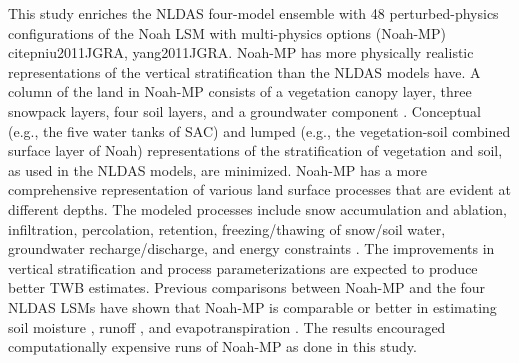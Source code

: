 \documentclass[essd]{copernicus}
\begin{document}
This study enriches the NLDAS four-model ensemble with 48 perturbed-physics configurations of the Noah LSM with multi-physics options (Noah-MP) citep{niu2011JGRA, yang2011JGRA}. Noah-MP has more physically realistic representations of the vertical stratification than the NLDAS models have. A column of the land in Noah-MP consists of a vegetation canopy layer, three snowpack layers, four soil layers, and a groundwater component \citep{niu2011JGRA}. Conceptual (e.g., the five water tanks of SAC) and lumped (e.g., the vegetation-soil combined surface layer of Noah) representations of the stratification of vegetation and soil, as used in the NLDAS models, are minimized. Noah-MP has a more comprehensive representation of various land surface processes that are evident at different depths. The modeled processes include snow accumulation and ablation, infiltration, percolation, retention, freezing/thawing of snow/soil water, groundwater recharge/discharge, and energy constraints \citep{niu2011JGRA}. The improvements in vertical stratification and process parameterizations are expected to produce better TWB estimates. Previous comparisons between Noah-MP and the four NLDAS LSMs have shown that Noah-MP is comparable or better in estimating soil moisture \citep{cai2014JGRAa}, runoff \citep{fei2021WRR, cai2014JGRAa}, and evapotranspiration \citep{zhang2020AFM}. The results encouraged computationally expensive runs of Noah-MP as done in this study.
\end{document}

